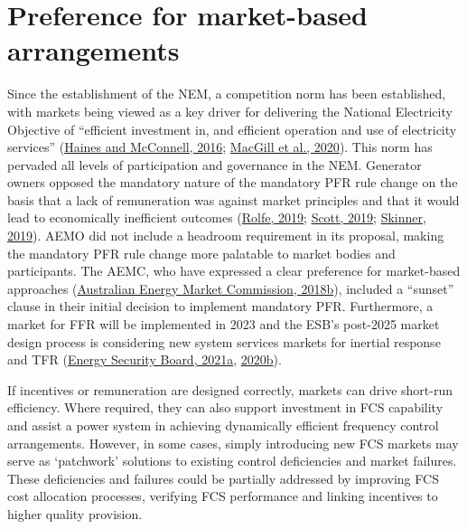 \documentclass[12pt,a4paper,]{report}
\begin{document}
\hypertarget{preference-for-market-based-arrangements}{%
\section{Preference for market-based
arrangements}\label{preference-for-market-based-arrangements}}

Since the establishment of the NEM, a competition norm has been
established, with markets being viewed as a key driver for delivering
the National Electricity Objective of ``efficient investment in, and
efficient operation and use of electricity services''
(\protect\hyperlink{ref-hainesEnvironmentalNormsElectricity2016}{Haines
and McConnell, 2016};
\protect\hyperlink{ref-macgillElectricityMarketNorms2020}{MacGill et
al., 2020}). This norm has pervaded all levels of participation and
governance in the NEM. Generator owners opposed the mandatory nature of
the mandatory PFR rule change on the basis that a lack of remuneration
was against market principles and that it would lead to economically
inefficient outcomes
(\protect\hyperlink{ref-rolfeMandatoryPrimaryFrequency2019}{Rolfe,
2019}; \protect\hyperlink{ref-scottMandatoryPrimaryFrequency2019}{Scott,
2019};
\protect\hyperlink{ref-skinnerMandatoryPrimaryFrequency2019}{Skinner,
2019}). AEMO did not include a headroom requirement in its proposal,
making the mandatory PFR rule change more palatable to market bodies and
participants. The AEMC, who have expressed a clear preference for
market-based approaches
(\protect\hyperlink{ref-australianenergymarketcommissionFrequencyControlFrameworks2018}{Australian
Energy Market Commission, 2018b}), included a ``sunset'' clause in their
initial decision to implement mandatory PFR. Furthermore, a market for
FFR will be implemented in 2023 and the ESB's post-2025 market design
process is considering new system services markets for inertial response
and TFR
(\protect\hyperlink{ref-energysecurityboardPost2025Market2021}{Energy
Security Board, 2021a},
\protect\hyperlink{ref-energysecurityboardPost2025Market2020}{2020b}).

If incentives or remuneration are designed correctly, markets can drive
short-run efficiency. Where required, they can also support investment
in FCS capability and assist a power system in achieving dynamically
efficient frequency control arrangements. However, in some cases, simply
introducing new FCS markets may serve as `patchwork' solutions to
existing control deficiencies and market failures. These deficiencies
and failures could be partially addressed by improving FCS cost
allocation processes, verifying FCS performance and linking incentives
to higher quality provision.
\end{document}
